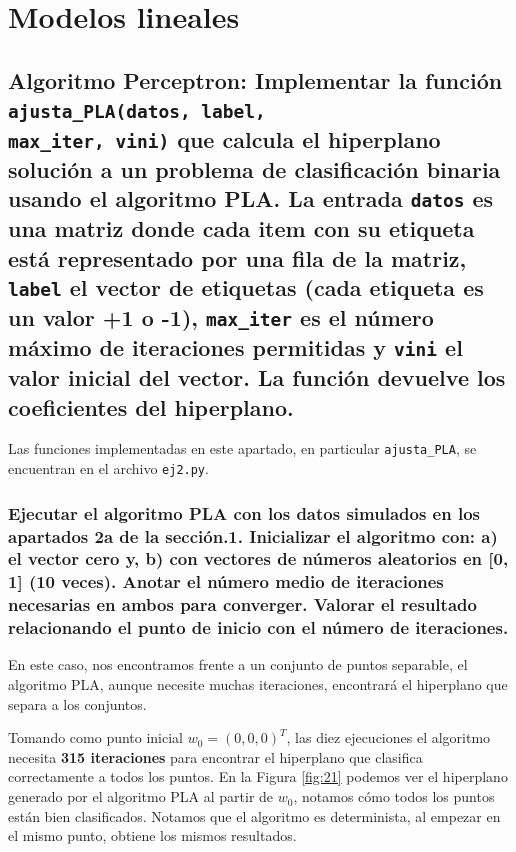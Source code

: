\documentclass[a4paper, 20pt]{article}
\begin{document}
\section{Modelos lineales}

\subsection{\textbf{Algoritmo Perceptron}: Implementar la función \texttt{ajusta\_PLA(datos, label,\\ max\_iter, vini)} que calcula el hiperplano solución a un problema de clasificación binaria usando el algoritmo PLA. La entrada \texttt{datos} es una matriz donde cada item con su etiqueta está representado por una fila de la matriz, \texttt{label} el vector de etiquetas (cada etiqueta es un valor +1 o -1), \texttt{max\_iter} es el número máximo de iteraciones permitidas y \texttt{vini} el valor inicial del vector. La función devuelve los coeficientes del hiperplano.}

Las funciones implementadas en este apartado, en particular \texttt{ajusta\_PLA}, se encuentran en el archivo \texttt{ej2.py}.

\subsubsection{Ejecutar el algoritmo PLA con los datos simulados en los apartados 2a de la sección.1. Inicializar el algoritmo con: a) el vector cero y, b) con vectores de números aleatorios en [0, 1] (10 veces). Anotar el número medio de iteraciones necesarias en ambos para converger. Valorar el resultado relacionando el punto de inicio con el número de iteraciones.}

En este caso, nos encontramos frente a un conjunto de puntos separable, el algoritmo PLA, aunque necesite muchas iteraciones, encontrará el hiperplano que separa a los conjuntos.

Tomando como punto inicial $w_0 = (0,0,0)^T$, las diez ejecuciones el algoritmo necesita \textbf{315 iteraciones} para encontrar el hiperplano que clasifica correctamente a todos los puntos. En la Figura \ref{fig:21} podemos ver el hiperplano generado por el algoritmo PLA al partir de $w_0$, notamos cómo todos los puntos están bien clasificados. Notamos que el algoritmo es determinista, al empezar en el mismo punto, obtiene los mismos resultados.
\end{document}
